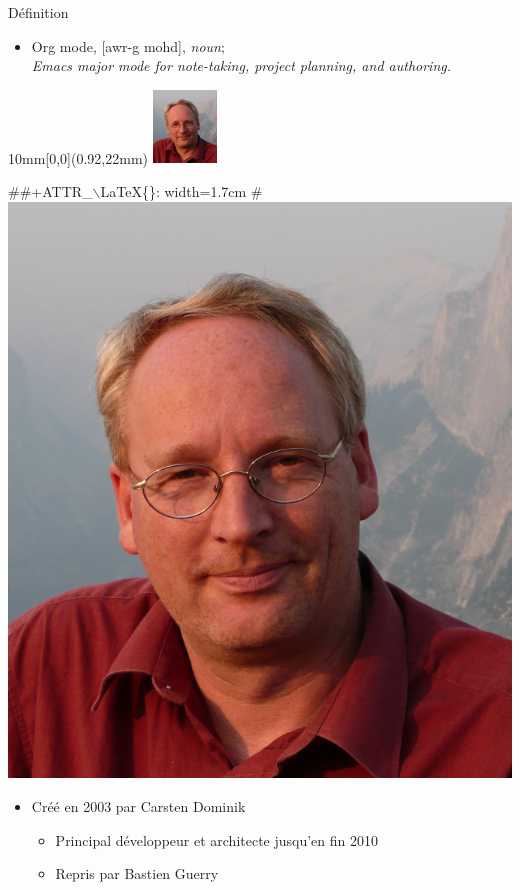 \documentclass[presentation,t,hideothersubsections]{beamer}
\newcommand\putpic[5]{%
\begin{textblock}{#3}(#1,#2)
\texttt{[image: \#5]}
\end{textblock}
}
\begin{document}
\begin{frame}[label=sec-1-2-1]{Définition}
\begin{itemize}
\item \alert{Org mode}, [awr-g mohd], \emph{noun}; \\
  \emph{Emacs major mode for note-taking, project planning, and authoring.}
\end{itemize}

\pause


\begin{textblock*}{10mm}[0,0](0.92\textwidth,22mm)
    \includegraphics[width=17mm]{Carsten.png}
\end{textblock*}

\#\#+ATTR\_$\backslash$LaTeX\{\}: width=1.7cm
\#\includegraphics[width=.9\linewidth]{Carsten.png}

\begin{itemize}
\item Créé en 2003 par Carsten Dominik
\begin{itemize}
\item Principal développeur et architecte jusqu'en fin 2010
\item Repris par Bastien Guerry
\end{itemize}


\end{itemize}
\end{frame}
\end{document}
